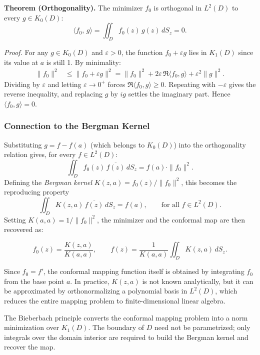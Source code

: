 \documentclass[12pt,a4paper]{article}
\begin{document}
\newpage

\begin{theorembox}
\textbf{Theorem (Orthogonality).} The minimizer \(f_0\) is orthogonal in \(L^2(D)\) to every \(g \in K_0(D)\):
\[
\langle f_0,\, g \rangle = \iint_D f_0(z)\,g(z)\,dS_z = 0.
\]
\end{theorembox}

\textit{Proof.} For any \(g \in K_0(D)\) and \(\varepsilon > 0\), the function \(f_0 + \varepsilon g\) lies in \(K_1(D)\) since its value at \(a\) is still 1. By minimality:
\begin{align*}
\|f_0\|^2 &\le \|f_0 + \varepsilon g\|^2 = \|f_0\|^2 + 2\varepsilon\,\Re\langle f_0,g\rangle + \varepsilon^2\|g\|^2.
\end{align*}
Dividing by \(\varepsilon\) and letting \(\varepsilon \to 0^+\) forces \(\Re\langle f_0,g\rangle \ge 0\). Repeating with \(-\varepsilon\) gives the reverse inequality, and replacing \(g\) by \(ig\) settles the imaginary part. Hence \(\langle f_0, g\rangle = 0\).

\subsubsection{Connection to the Bergman Kernel}

Substituting \(g = f - f(a)\) (which belongs to \(K_0(D)\)) into the orthogonality relation gives, for every \(f \in L^2(D)\):
\[
\iint_D f_0(z)\,\overline{f(z)}\,dS_z = f(a)\cdot\|f_0\|^2.
\]
Defining the \textit{Bergman kernel} \(K(z,a) = f_0(z)/\|f_0\|^2\), this becomes the reproducing property
\[
\iint_D K(z,a)\,\overline{f(z)}\,dS_z = f(a), \qquad \text{for all } f \in L^2(D).
\]
Setting \(K(a,a) = 1/\|f_0\|^2\), the minimizer and the conformal map are then recovered as:
\begin{formulabox}
\[
f_0(z) = \frac{K(z,a)}{K(a,a)}, \qquad f(z) = \frac{1}{K(a,a)}\iint_D K(z,a)\,dS_z.
\]
\end{formulabox}
Since \(f_0 = f'\), the conformal mapping function itself is obtained by integrating \(f_0\) from the base point \(a\). In practice, \(K(z,a)\) is not known analytically, but it can be approximated by orthonormalizing a polynomial basis in \(L^2(D)\), which reduces the entire mapping problem to finite-dimensional linear algebra.

\begin{importantbox}
The Bieberbach principle converts the conformal mapping problem into a norm minimization over \(K_1(D)\). The boundary of \(D\) need not be parametrized; only integrals over the domain interior are required to build the Bergman kernel and recover the map.
\end{importantbox}
\end{document}

